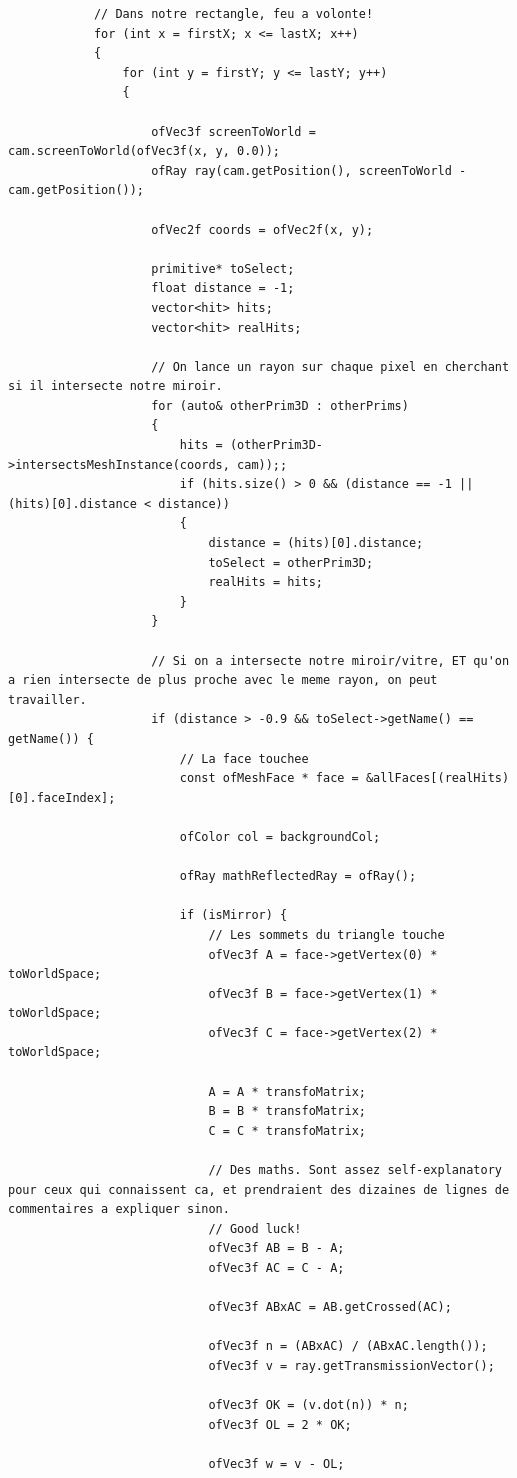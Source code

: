 \begin{lstlisting}
			// Dans notre rectangle, feu a volonte!
			for (int x = firstX; x <= lastX; x++)
			{
				for (int y = firstY; y <= lastY; y++)
				{
				
					ofVec3f screenToWorld = cam.screenToWorld(ofVec3f(x, y, 0.0));
					ofRay ray(cam.getPosition(), screenToWorld - cam.getPosition());
					
					ofVec2f coords = ofVec2f(x, y);
					
					primitive* toSelect;
					float distance = -1;
					vector<hit> hits;
					vector<hit> realHits;
					
					// On lance un rayon sur chaque pixel en cherchant si il intersecte notre miroir.
					for (auto& otherPrim3D : otherPrims)
					{
						hits = (otherPrim3D->intersectsMeshInstance(coords, cam));;
						if (hits.size() > 0 && (distance == -1 || (hits)[0].distance < distance))
						{
							distance = (hits)[0].distance;
							toSelect = otherPrim3D;
							realHits = hits;
						}
					}
					
					// Si on a intersecte notre miroir/vitre, ET qu'on a rien intersecte de plus proche avec le meme rayon, on peut travailler.
					if (distance > -0.9 && toSelect->getName() == getName()) {
						// La face touchee
						const ofMeshFace * face = &allFaces[(realHits)[0].faceIndex];
						
						ofColor col = backgroundCol;
						
						ofRay mathReflectedRay = ofRay();
						
						if (isMirror) {
							// Les sommets du triangle touche
							ofVec3f A = face->getVertex(0) * toWorldSpace;
							ofVec3f B = face->getVertex(1) * toWorldSpace;
							ofVec3f C = face->getVertex(2) * toWorldSpace;
							
							A = A * transfoMatrix;
							B = B * transfoMatrix;
							C = C * transfoMatrix;
							
							// Des maths. Sont assez self-explanatory pour ceux qui connaissent ca, et prendraient des dizaines de lignes de commentaires a expliquer sinon.
							// Good luck!
							ofVec3f AB = B - A;
							ofVec3f AC = C - A;
							
							ofVec3f ABxAC = AB.getCrossed(AC);
							
							ofVec3f n = (ABxAC) / (ABxAC.length());
							ofVec3f v = ray.getTransmissionVector();
							
							ofVec3f OK = (v.dot(n)) * n;
							ofVec3f OL = 2 * OK;
							
							ofVec3f w = v - OL;
							

\end{lstlisting}

